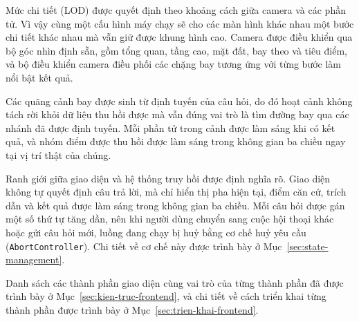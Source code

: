 Mức chi tiết (LOD) được quyết định theo khoảng cách giữa camera và các phần tử. Vì vậy cùng một cấu hình máy chạy sẽ cho các màn hình khác nhau một bước chi tiết khác nhau mà vẫn giữ được khung hình cao. Camera được điều khiển qua bộ góc nhìn định sẵn, gồm tổng quan, tầng cao, mặt đất, bay theo và tiêu điểm, và bộ điều khiển camera điều phối các chặng bay tương ứng với từng bước làm nổi bật kết quả.

Các quãng cảnh bay được sinh từ định tuyến của câu hỏi, do đó hoạt cảnh không tách rời khỏi dữ liệu thu hồi được mà vẫn đúng vai trò là tìm đường bay qua các nhánh đã được định tuyến. Mỗi phần tử trong cảnh được làm sáng khi có kết quả, và nhóm điểm được thu hồi được làm sáng trong không gian ba chiều ngay tại vị trí thật của chúng.

Ranh giới giữa giao diện và hệ thống truy hồi được định nghĩa rõ. Giao diện không tự quyết định câu trả lời, mà chỉ hiển thị pha hiện tại, điểm căn cứ, trích dẫn và kết quả được làm sáng trong không gian ba chiều. Mỗi câu hỏi được gán một số thứ tự tăng dần, nên khi người dùng chuyển sang cuộc hội thoại khác hoặc gửi câu hỏi mới, luồng đang chạy bị huỷ bằng cơ chế huỷ yêu cầu (\texttt{AbortController}). Chi tiết về cơ chế này được trình bày ở Mục~\ref{sec:state-management}.

Danh sách các thành phần giao diện cùng vai trò của từng thành phần đã được trình bày ở Mục~\ref{sec:kien-truc-frontend}, và chi tiết về cách triển khai từng thành phần được trình bày ở Mục~\ref{sec:trien-khai-frontend}.
